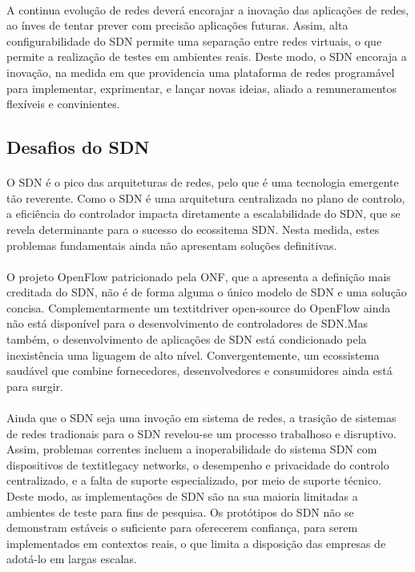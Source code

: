 \documentclass{llncs}
\begin{document}
\paragraph{}
A continua evolução de redes deverá encorajar a inovação das aplicações de redes, ao ínves de tentar prever com precisão aplicações futuras. Assim, alta configurabilidade do
SDN permite uma separação entre redes virtuais, o que permite a realização de testes em ambientes reais. Deste modo, o SDN encoraja a inovação, na medida em que providencia 
uma plataforma de redes programável para implementar, exprimentar, e lançar novas ideias, aliado a remuneramentos flexíveis e convinientes. \cite{paper1}
\subsection{Desafios do SDN}
\paragraph{}
O SDN é o pico das arquiteturas de redes, pelo que é uma tecnologia emergente tão reverente. 
Como o SDN é uma arquitetura centralizada no plano de controlo, a eficiência do controlador impacta diretamente a escalabilidade do SDN, 
que se revela determinante para o sucesso do ecossitema SDN. Nesta medida, estes problemas fundamentais ainda não apresentam soluções definitivas.\cite{performance}
\paragraph{}
O projeto OpenFlow patricionado pela ONF, que a apresenta a definição mais creditada do SDN, não é de forma alguma o único modelo de SDN e uma solução concisa. 
Complementarmente um textit{driver open-source} do OpenFlow ainda não está disponível para o desenvolvimento de controladores de SDN.Mas também, o desenvolvimento de aplicações de SDN está condicionado pela inexistência uma liguagem de alto nível. 
Convergentemente, um ecossistema saudável que combine fornecedores, desenvolvedores e consumidores ainda está para surgir. \cite{paper1} 
\paragraph{}
Ainda que o SDN seja uma invoção em sistema de redes, a trasição de sistemas de redes tradionais para o SDN revelou-se um processo trabalhoso e disruptivo. Assim, problemas correntes incluem
a inoperabilidade  do sistema SDN com dispositivos de textit{legacy networks}, o desempenho e privacidade do controlo centralizado, e a falta de suporte especializado, por meio de suporte técnico.
Deste modo, as implementações de SDN são na sua maioria limitadas a ambientes de teste para fins de pesquisa. Os protótipos do SDN não se demonstram estáveis o suficiente para oferecerem confiança, para serem implementados em contextos reais, o que limita a disposição das empresas de adotá-lo em largas escalas.\cite{paper1}
\end{document}
